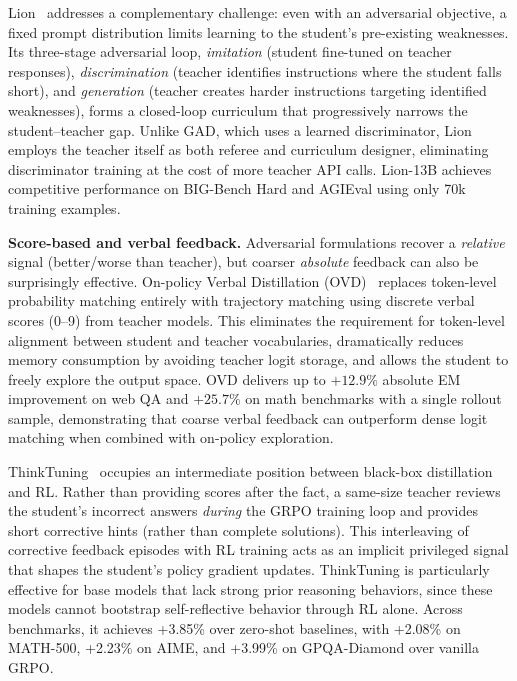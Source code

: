 \documentclass{article} %
\begin{document}
Lion~\citep{2305.12870} addresses a complementary challenge: even with an adversarial objective, a fixed prompt distribution limits learning to the student's pre-existing weaknesses. Its three-stage adversarial loop, \emph{imitation} (student fine-tuned on teacher responses), \emph{discrimination} (teacher identifies instructions where the student falls short), and \emph{generation} (teacher creates harder instructions targeting identified weaknesses), forms a closed-loop curriculum that progressively narrows the student--teacher gap. Unlike GAD, which uses a learned discriminator, Lion employs the teacher itself as both referee and curriculum designer, eliminating discriminator training at the cost of more teacher API calls. Lion-13B achieves competitive performance on BIG-Bench Hard and AGIEval using only 70k training examples.

\textbf{Score-based and verbal feedback.}
Adversarial formulations recover a \emph{relative} signal (better/worse than teacher), but coarser \emph{absolute} feedback can also be surprisingly effective. On-policy Verbal Distillation (OVD)~\citep{2601.21968} replaces token-level probability matching entirely with trajectory matching using discrete verbal scores (0--9) from teacher models. This eliminates the requirement for token-level alignment between student and teacher vocabularies, dramatically reduces memory consumption by avoiding teacher logit storage, and allows the student to freely explore the output space. OVD delivers up to $+12.9\%$ absolute EM improvement on web QA and $+25.7\%$ on math benchmarks with a single rollout sample, demonstrating that coarse verbal feedback can outperform dense logit matching when combined with on-policy exploration.

ThinkTuning~\citep{rrv2025thinktuning} occupies an intermediate position between black-box distillation and RL. Rather than providing scores after the fact, a same-size teacher reviews the student's incorrect answers \emph{during} the GRPO training loop and provides short corrective hints (rather than complete solutions). This interleaving of corrective feedback episodes with RL training acts as an implicit privileged signal that shapes the student's policy gradient updates. ThinkTuning is particularly effective for base models that lack strong prior reasoning behaviors, since these models cannot bootstrap self-reflective behavior through RL alone. Across benchmarks, it achieves +3.85\% over zero-shot baselines, with +2.08\% on MATH-500, +2.23\% on AIME, and +3.99\% on GPQA-Diamond over vanilla GRPO.
\end{document}

